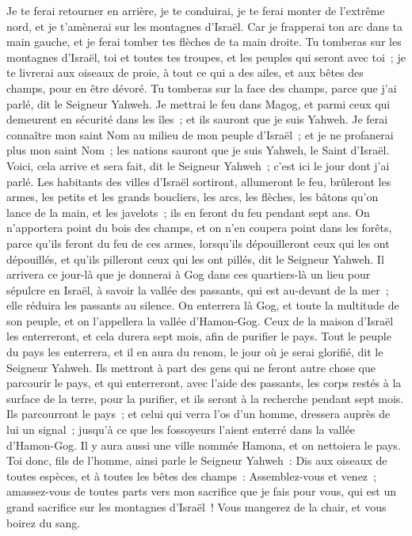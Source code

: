 \begin{multicols}{2}
Je te ferai retourner en arrière, je te conduirai, je te ferai monter de l'extrême nord, et je t'amènerai sur les montagnes d'Israël.
Car je frapperai ton arc dans ta main gauche, et je ferai tomber tes flèches de ta main droite.
Tu tomberas sur les montagnes d'Israël, toi et toutes tes troupes, et les peuples qui seront avec toi~; je te livrerai aux oiseaux de proie, à tout ce qui a des ailes, et aux bêtes des champs, pour en être dévoré.
Tu tomberas sur la face des champs, parce que j'ai parlé, dit le Seigneur Yahweh.
Je mettrai le feu dans Magog, et parmi ceux qui demeurent en sécurité dans les îles~; et ils sauront que je suis Yahweh.
Je ferai connaître mon saint Nom au milieu de mon peuple d'Israël~; et je ne profanerai plus mon saint Nom~; les nations sauront que je suis Yahweh, le Saint d'Israël.
Voici, cela arrive et sera fait, dit le Seigneur Yahweh~; c'est ici le jour dont j'ai parlé.
Les habitants des villes d'Israël sortiront, allumeront le feu, brûleront les armes, les petits et les grands boucliers, les arcs, les flèches, les bâtons qu'on lance de la main, et les javelots~; ils en feront du feu pendant sept ans.
On n'apportera point du bois des champs, et on n'en coupera point dans les forêts, parce qu'ils feront du feu de ces armes, lorsqu'ils dépouilleront ceux qui les ont dépouillés, et qu'ils pilleront ceux qui les ont pillés, dit le Seigneur Yahweh.
Il arrivera ce jour-là que je donnerai à Gog dans ces quartiers-là un lieu pour sépulcre en Israël, à savoir la vallée des passants, qui est au-devant de la mer~; elle réduira les passants au silence. On enterrera là Gog, et toute la multitude de son peuple, et on l'appellera la vallée d'Hamon-Gog.
Ceux de la maison d'Israël les enterreront, et cela durera sept mois, afin de purifier le pays.
Tout le peuple du pays les enterrera, et il en aura du renom, le jour où je serai glorifié, dit le Seigneur Yahweh.
Ils mettront à part des gens qui ne feront autre chose que parcourir le pays, et qui enterreront, avec l'aide des passants, les corps restés à la surface de la terre, pour la purifier, et ils seront à la recherche pendant sept mois.
Ils parcourront le pays~; et celui qui verra l'os d'un homme, dressera auprès de lui un signal~; jusqu'à ce que les fossoyeurs l'aient enterré dans la vallée d'Hamon-Gog.
Il y aura aussi une ville nommée Hamona, et on nettoiera le pays.
Toi donc, fils de l'homme, ainsi parle le Seigneur Yahweh~: Dis aux oiseaux de toutes espèces, et à toutes les bêtes des champs~: Assemblez-vous et venez~; amassez-vous de toutes parts vers mon sacrifice que je fais pour vous, qui est un grand sacrifice sur les montagnes d'Israël~! Vous mangerez de la chair, et vous boirez du sang.

\end{multicols}

